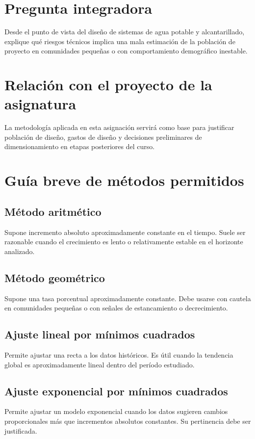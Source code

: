 \documentclass[12pt]{article}
\begin{document}
\section{Pregunta integradora}
Desde el punto de vista del diseño de sistemas de agua potable y alcantarillado, explique qué riesgos técnicos implica una mala estimación de la población de proyecto en comunidades pequeñas o con comportamiento demográfico inestable.

\section{Relación con el proyecto de la asignatura}
La metodología aplicada en esta asignación servirá como base para justificar población de diseño, gastos de diseño y decisiones preliminares de dimensionamiento en etapas posteriores del curso.

\appendix
\section{Guía breve de métodos permitidos}
\subsection{Método aritmético}
Supone incremento absoluto aproximadamente constante en el tiempo. Suele ser razonable cuando el crecimiento es lento o relativamente estable en el horizonte analizado.

\subsection{Método geométrico}
Supone una tasa porcentual aproximadamente constante. Debe usarse con cautela en comunidades pequeñas o con señales de estancamiento o decrecimiento.

\subsection{Ajuste lineal por mínimos cuadrados}
Permite ajustar una recta a los datos históricos. Es útil cuando la tendencia global es aproximadamente lineal dentro del período estudiado.

\subsection{Ajuste exponencial por mínimos cuadrados}
Permite ajustar un modelo exponencial cuando los datos sugieren cambios proporcionales más que incrementos absolutos constantes. Su pertinencia debe ser justificada.
\end{document}
